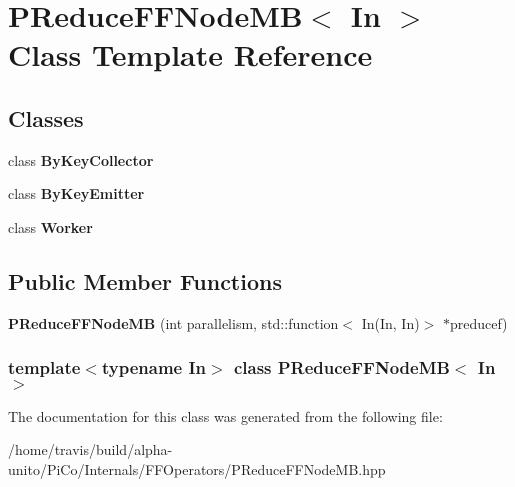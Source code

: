 \hypertarget{class_p_reduce_f_f_node_m_b}{\section{\-P\-Reduce\-F\-F\-Node\-M\-B$<$ \-In $>$ \-Class \-Template \-Reference}
\label{class_p_reduce_f_f_node_m_b}
}
\subsection*{\-Classes}
\begin{DoxyCompactItemize}
\item 
class {\bfseries \-By\-Key\-Collector}
\item 
class {\bfseries \-By\-Key\-Emitter}
\item 
class {\bfseries \-Worker}
\end{DoxyCompactItemize}
\subsection*{\-Public \-Member \-Functions}
\begin{DoxyCompactItemize}
\item 
\hypertarget{class_p_reduce_f_f_node_m_b_a3e76e132220aa682d6fe2f36b77aca67}{{\bfseries \-P\-Reduce\-F\-F\-Node\-M\-B} (int parallelism, std\-::function$<$ \-In(\-In, \-In)$>$ $\ast$preducef)}\label{class_p_reduce_f_f_node_m_b_a3e76e132220aa682d6fe2f36b77aca67}

\end{DoxyCompactItemize}
\subsubsection*{template$<$typename In$>$ class P\-Reduce\-F\-F\-Node\-M\-B$<$ In $>$}



\-The documentation for this class was generated from the following file\-:\begin{DoxyCompactItemize}
\item 
/home/travis/build/alpha-\/unito/\-Pi\-Co/\-Internals/\-F\-F\-Operators/\-P\-Reduce\-F\-F\-Node\-M\-B.\-hpp\end{DoxyCompactItemize}
